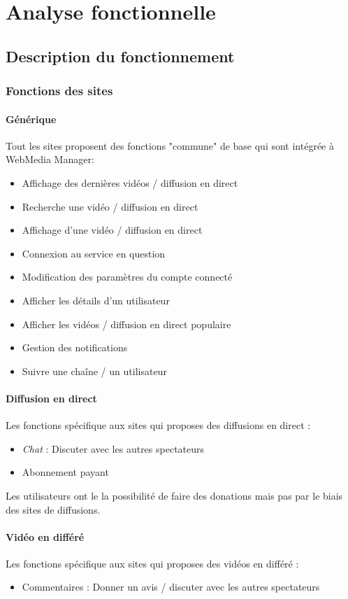 \documentclass[11pt]{report} %
\begin{document}
		
\chapter{Analyse fonctionnelle}
	\section{Description du fonctionnement}
		\subsection{Fonctions des sites}
			\subsubsection{Générique}
			Tout les sites proposent des fonctions "commune" de base qui sont intégrée à WebMedia Manager:
			\begin{itemize}
				\item Affichage des dernières vidéos / diffusion en direct
				\item Recherche une vidéo / diffusion en direct
				\item Affichage d'une vidéo / diffusion en direct
				\item Connexion au service en question
				\item Modification des paramètres du compte connecté
				\item Afficher les détails d'un utilisateur
				\item Afficher les vidéos / diffusion en direct populaire
				\item Gestion des notifications
				\item Suivre une chaîne / un utilisateur
			\end{itemize}
			
			\subsubsection{Diffusion en direct}
			Les fonctions spécifique aux sites qui proposes des diffusions en direct :
			\begin{itemize}
				\item \textit{Chat} : Discuter avec les autres spectateurs
				\item Abonnement payant
			\end{itemize}
			Les utilisateurs ont le la possibilité de faire des donations mais pas par le biais des sites de diffusions.
			
			\subsubsection{Vidéo en différé}
			Les fonctions spécifique aux sites qui proposes des vidéos en différé :
			\begin{itemize}
				\item Commentaires : Donner un avis / discuter avec les autres spectateurs
			\end{itemize}
	
\end{document}
